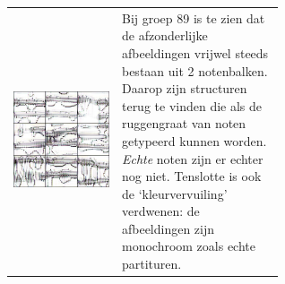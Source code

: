 \documentclass[dutch, twoside, a4paper, 10pt]{article}
\begin{document}
\begin{table}[H]
\begin{tabular}{c p{0.6\linewidth}}
          \includegraphics[scale=0.18]{89.jpg} & \vspace{-10\baselineskip} Bij groep 89 is te zien dat de afzonderlijke afbeeldingen vrijwel steeds bestaan uit 2 notenbalken. Daarop zijn structuren terug te vinden die als de ruggengraat van noten getypeerd kunnen worden. \textit{Echte} noten zijn er echter nog niet. Tenslotte is ook de `kleurvervuiling' verdwenen: de afbeeldingen zijn monochroom zoals echte partituren.\\

\end{tabular}
\end{table}
\end{document}
